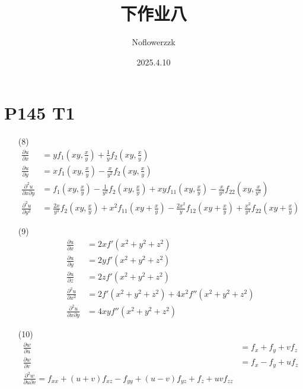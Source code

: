 \documentclass{article}
\title{下作业八}
\author{Noflowerzzk}
\date{2025.4.10}
\begin{document}
\maketitle

\section*{P145 T1}

\begin{itemize}
    \item [(8)] 
    \begin{align*}
        \frac{\partial u}{\partial x} &= yf_1\left(xy, \frac{x}{y}\right) + \frac{1}{y}f_2\left(xy, \frac{x}{y}\right) \\
        \frac{\partial u}{\partial y} &= xf_1\left(xy, \frac{x}{y}\right) - \frac{x}{y^2}f_2\left(xy, \frac{x}{y}\right) \\
        \frac{\partial^2 u}{\partial x \partial y} &= f_1\left(xy, \frac{x}{y}\right) - \frac{1}{y^2}f_2\left(xy, \frac{x}{y}\right) + xyf_{11}\left(xy, \frac{x}{y}\right) - \frac{x}{y^2}f_{22}\left(xy, \frac{x}{y^3}\right) \\
        \frac{\partial^2 u}{\partial y^2} &= \frac{2x}{y^3}f_2\left(xy, \frac{x}{y}\right) + x^2f_{11}\left(xy + \frac{x}{y}\right) - \frac{2x^2}{y}f_{12}\left(xy + \frac{x}{y}\right) + \frac{x^2}{y^4}f_{22}\left(xy + \frac{x}{y}\right)
    \end{align*}
    \item [(9)] \begin{align*}
        \frac{\partial u}{\partial x} &= 2xf'(x^2 + y^2 + z^2) \\
        \frac{\partial u}{\partial y} &= 2yf'(x^2 + y^2 + z^2) \\
        \frac{\partial u}{\partial z} &= 2zf'(x^2 + y^2 + z^2) \\
        \frac{\partial^2 u}{\partial x^2} &= 2f'(x^2 + y^2 + z^2) + 4x^2f''(x^2 + y^2 + z^2) \\
        \frac{\partial^2 u}{\partial x \partial y} &= 4xyf''(x^2 + y^2 + z^2) 
    \end{align*}
    \item [(10)] 
    \begin{align*}
        \frac{\partial w}{\partial u} &= f_x + f_y + vf_z \\
        \frac{\partial w}{\partial v} &= f_x - f_y + uf_z \\
        \frac{\partial^2 w}{\partial u \partial v} = f_{xx} + (u + v)f_{xz} - f_{yy} + (u - v)f_{yz} + f_z + uvf_{zz}
    \end{align*}
\end{itemize}
\end{document}
